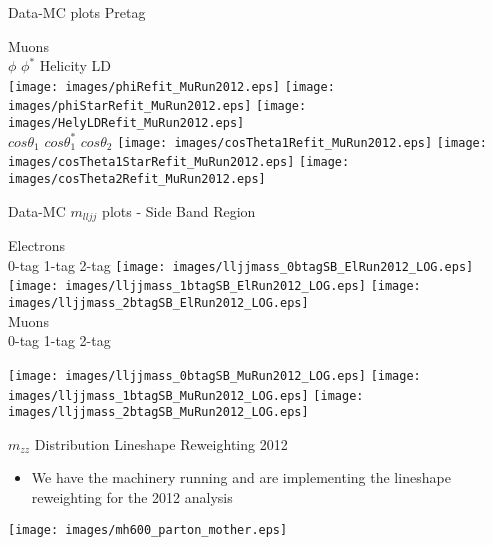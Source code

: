 \documentclass{beamer}
\begin{document}
\begin{frame}{Data-MC plots Pretag}
  \begin{center}
    Muons\\
    $\phi$ \hspace{7.5em} $\phi^{*}$ \hspace{7.5em} Helicity LD
    \\
  \texttt{[image: images/phiRefit\_MuRun2012.eps]}
  \texttt{[image: images/phiStarRefit\_MuRun2012.eps]}
  \texttt{[image: images/HelyLDRefit\_MuRun2012.eps]}\\
  $cos\theta_{1}$ \hspace{7.5em} $cos\theta_{1}^{*}$ \hspace{7.5em} $cos\theta_{2}$
  \texttt{[image: images/cosTheta1Refit\_MuRun2012.eps]}
  \texttt{[image: images/cosTheta1StarRefit\_MuRun2012.eps]}
  \texttt{[image: images/cosTheta2Refit\_MuRun2012.eps]}
  \end{center}
\end{frame}

\begin{frame}{Data-MC $m_{lljj}$ plots - Side Band Region}
  \begin{center}
    Electrons\\
    0-tag \hspace{7.5em} 1-tag \hspace{7.5em} 2-tag
  \texttt{[image: images/lljjmass\_0btagSB\_ElRun2012\_LOG.eps]}
  \texttt{[image: images/lljjmass\_1btagSB\_ElRun2012\_LOG.eps]}
  \texttt{[image: images/lljjmass\_2btagSB\_ElRun2012\_LOG.eps]}\\
  Muons\\
    0-tag \hspace{7.5em} 1-tag \hspace{7.5em} 2-tag
  
  \texttt{[image: images/lljjmass\_0btagSB\_MuRun2012\_LOG.eps]}
  \texttt{[image: images/lljjmass\_1btagSB\_MuRun2012\_LOG.eps]}
  \texttt{[image: images/lljjmass\_2btagSB\_MuRun2012\_LOG.eps]}
  \end{center}
\end{frame}

\begin{frame}{$m_{zz}$ Distribution Lineshape Reweighting 2012}
  \begin{itemize}
  \item
    We have the machinery running and are implementing the lineshape reweighting for the 2012 analysis
  \end{itemize}

\begin{center}
  \texttt{[image: images/mh600\_parton\_mother.eps]}
\end{center}
\end{frame}
\end{document}
